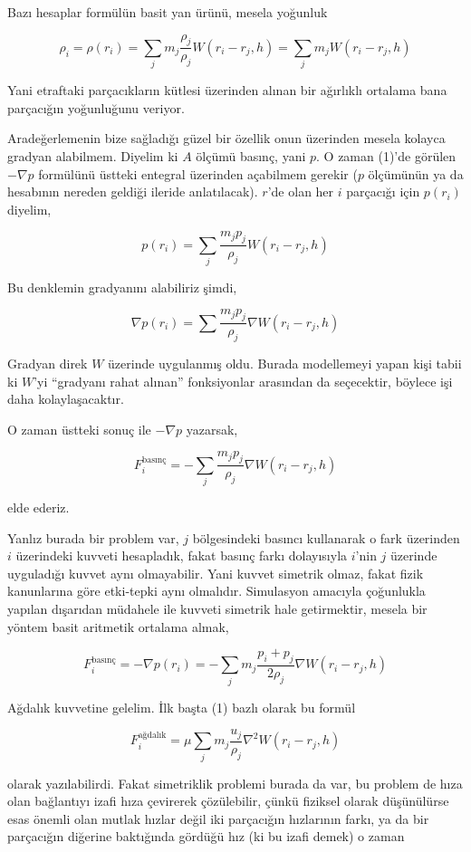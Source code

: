 \documentclass[12pt,fleqn]{article}\usepackage{../../common}
\begin{document}
Bazı hesaplar formülün basit yan ürünü, mesela yoğunluk

$$
\rho_i = \rho(r_i) = \sum_j m_j \frac{\rho_j}{\rho_j} W(r_i-r_j, h) =
\sum_j m_j  W(r_i-r_j, h)
$$

Yani etraftaki parçacıkların kütlesi üzerinden alınan bir ağırlıklı ortalama
bana parçacığın yoğunluğunu veriyor.

Aradeğerlemenin bize sağladığı güzel bir özellik onun üzerinden mesela kolayca
gradyan alabilmem. Diyelim ki $A$ ölçümü basınç, yani $p$. O zaman (1)'de
görülen $-\nabla p$ formülünü üstteki entegral üzerinden açabilmem gerekir ($p$
ölçümünün ya da hesabının nereden geldiği ileride anlatılacak). $r$'de olan her
$i$ parçacığı için $p(r_i)$ diyelim,

$$
p(r_i) = \sum_j \frac{m_j p_j}{\rho_j} W(r_i-r_j,h)
$$

Bu denklemin gradyanını alabiliriz şimdi,

$$
\nabla p(r_i) = \sum \frac{m_j p_j}{\rho_j} \nabla W(r_i-r_j,h)
$$

Gradyan direk $W$ üzerinde uygulanmış oldu. Burada modellemeyi yapan kişi tabii
ki $W$'yi ``gradyanı rahat alınan'' fonksiyonlar arasından da seçecektir,
böylece işi daha kolaylaşacaktır.

O zaman üstteki sonuç ile $-\nabla p$ yazarsak,

$$
F_i^{\textrm{basınç}} = - \sum_j \frac{m_j p_j}{\rho_j} \nabla W(r_i-r_j,h)
$$

elde ederiz.

Yanlız burada bir problem var, $j$ bölgesindeki basıncı kullanarak o fark
üzerinden $i$ üzerindeki kuvveti hesapladık, fakat basınç farkı dolayısıyla
$i$'nin $j$ üzerinde uyguladığı kuvvet aynı olmayabilir. Yani kuvvet simetrik
olmaz, fakat fizik kanunlarına göre etki-tepki aynı olmalıdır. Simulasyon
amacıyla çoğunlukla yapılan dışarıdan müdahele ile kuvveti simetrik hale
getirmektir, mesela bir yöntem basit aritmetik ortalama almak,

$$
F_i^{\textrm{basınç}} = - \nabla p(r_i) =
- \sum_j m_j \frac{p_i + p_j}{2 \rho_j} \nabla W(r_i-r_j,h)
$$

Ağdalık kuvvetine gelelim. İlk başta (1) bazlı olarak bu formül

$$
F_i^{\textrm{ağdalık}} = \mu \sum_j m_j \frac{u_j}{\rho_j} \nabla^2 W (r_i-r_j, h)
$$

olarak yazılabilirdi. Fakat simetriklik problemi burada da var, bu problem de
hıza olan bağlantıyı izafi hıza çevirerek çözülebilir, çünkü fiziksel olarak
düşünülürse esas önemli olan mutlak hızlar değil iki parçacığın hızlarının
farkı, ya da bir parçacığın diğerine baktığında gördüğü hız (ki bu izafi demek)
o zaman
\end{document}
